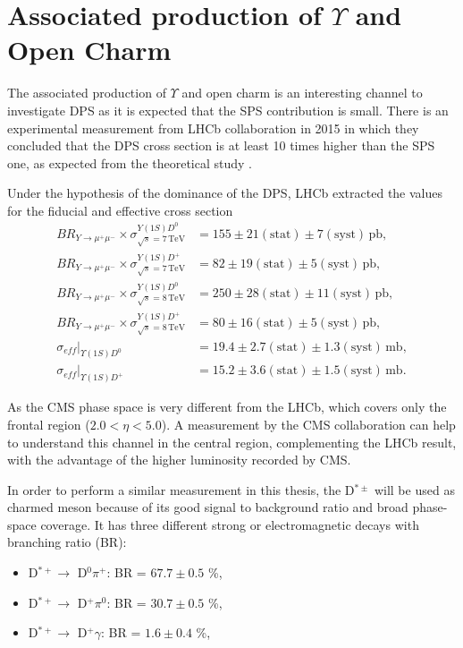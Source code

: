 \section{Associated production of \texorpdfstring{$\Upsilon$}{Y } and Open Charm} \label{sec:theoryY+D}

The associated production of $\Upsilon$ and open charm is an interesting channel to investigate DPS \cite{Lansberg:2019adr} as it is expected that the SPS contribution is small. There is an experimental measurement from LHCb collaboration in 2015 \cite{aaij2016production} in which they concluded that the DPS cross section is at least 10 times higher than the SPS one, as expected from the theoretical study \cite{Berezhnoy:2015jga}. 

Under the hypothesis of the dominance of the DPS, LHCb extracted the values for the fiducial and effective cross section
\begin{equation}
\begin{split}
    BR_{Y \rightarrow \mu^+\mu^-} \times \sigma^{Y(1S)D^0}_{\sqrt{s}=7\, \text{TeV}} &= 155 \pm 21 (\text{stat}) \pm 7(\text{syst}) \, \text{pb}, \\
    BR_{Y \rightarrow \mu^+\mu^-} \times \sigma^{Y(1S)D^+}_{\sqrt{s}=7\, \text{TeV}} &= 82 \pm 19 (\text{stat}) \pm 5(\text{syst}) \, \text{pb}, \\
    BR_{Y \rightarrow \mu^+\mu^-} \times \sigma^{Y(1S)D^0}_{\sqrt{s}=8\, \text{TeV}} &= 250 \pm 28 (\text{stat}) \pm 11(\text{syst}) \, \text{pb}, \\
    BR_{Y \rightarrow \mu^+\mu^-} \times \sigma^{Y(1S)D^+}_{\sqrt{s}=8\, \text{TeV}} &= 80 \pm 16 (\text{stat}) \pm 5(\text{syst}) \, \text{pb}, \\
    \sigma_{eff}|_{\Upsilon(1S)D^0} &= 19.4 \pm 2.7 (\text{stat}) \pm 1.3 (\text{syst}) \, \text{mb}, \\
    \sigma_{eff}|_{\Upsilon(1S)D^+} &= 15.2 \pm 3.6 (\text{stat}) \pm 1.5 (\text{syst}) \, \text{mb}. 
\end{split}
\end{equation}

As the CMS phase space is very different from the LHCb, which covers only the frontal region ($2.0 < \eta < 5.0$). A measurement by the CMS collaboration can help to understand this channel in the central region, complementing the LHCb result, with the advantage of the higher luminosity recorded by CMS.

In order to perform a similar measurement in this thesis, the D$^{*\pm}$ will be used as charmed meson because of its good signal to background ratio and broad phase-space coverage. It has three different strong or electromagnetic decays \cite{Workman:2022ynf} with branching ratio (BR):
\begin{itemize}
    \item D$^{*+} \rightarrow$ D$^0 \pi^+$: BR = $67.7 \pm 0.5$ \%,
    \item D$^{*+} \rightarrow$ D$^+ \pi^0$: BR = $30.7 \pm 0.5$ \%,
    \item D$^{*+} \rightarrow$ D$^+ \gamma$: BR = $1.6 \pm 0.4$ \%,
\end{itemize}

